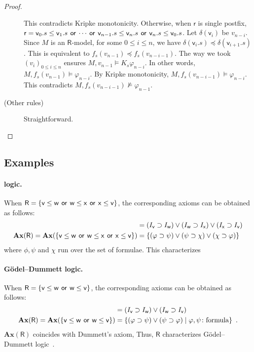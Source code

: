 \begin{proof}
\begin{description}
	   This contradicts Kripke monotonicity.
	   Otherwise, when $\mathsf r$ is single postfix,
	   $\mathsf r = \mathsf v_0.s\le\mathsf
	   v_1.s\,\mathbin{\mathsf{or}}\,\cdots\,\mathbin{\mathsf{or}}\,\mathsf v_{n-1}.s\le\mathsf
	   v_n.s\,\mathbin{\mathsf{or}}\,\mathsf v_n.s\le\mathsf v_0.s$.
	   Let $\delta(\mathsf v_i)$ be $v_{n-i}$.
	   Since $M$ is an $\mathsf R$-model,
	   for some $0\le i\le n$,
	   we have $\delta(\mathsf v_i.s)\preceq \delta(\mathsf
	   v_{i+1}.s)$.
	   This is equivalent to $f_s(v_{n-1})\preceq f_s(v_{n-i-1})$.
	   The way we took $(v_i)_{0\le i\le n}$ ensures
	   $M,v_{n-1}\models K_s\varphi_{n-i}$.
	   In other words, $M,f_s(v_{n-1})\models \varphi_{n-i}$.
	   By Kripke monotonicity, $M,f_s(v_{n-i-1})\models
	   \varphi_{n-i}$.
	   This contradicts $M,f_s(v_{n-i-1})\not\models\varphi_{n-1}$.
      \item[(Other rules)]
	   Straightforward.
     \end{description}
    \end{proof}

   \subsection{Examples}

    \paragraph{ logic.}
    When
    $\mathsf R = \{\mathsf v\le\mathsf w\,\mathbin{\mathsf{or}}\,\mathsf w\le\mathsf x\,\mathbin{\mathsf{or}}\,\mathsf x\le\mathsf
    v\}$,
    the corresponding axioms can be obtained as follows:
    \begin{align*}
     [ \mathsf v\le \mathsf w\wor \mathsf w\le\mathsf x\wor \mathsf x\le\mathsf v ] &=
     (I_{\mathsf v}\supset I_{\mathsf w})\vee (I_{\mathsf w}\supset
     I_{\mathsf x})\vee (I_{\mathsf x}\supset I_{\mathsf v})
     \\
     \mathbf{Ax}(\mathsf R) = \mathbf{Ax}(\{\mathsf v\le\mathsf w\wor \mathsf
     w\le \mathsf x \wor \mathsf x\le\mathsf v\}) &= \{(\varphi\supset\psi)\vee(\psi\supset\chi)\vee(\chi\supset\varphi)\}
    \end{align*}
    where $\phi,\psi$ and $\chi$ run over the set of formulae.
    This characterizes 

    \paragraph{G\"{o}del--Dummett logic.}
    When $\mathsf R=\{\mathsf v\le\mathsf w\,\mathbin{\mathsf{or}}\,\mathsf w\le\mathsf v\}$,
    the corresponding axioms can be obtained as follows:
    \begin{align*}
     [\mathsf v\le \mathsf w\wor \mathsf w\le\mathsf v] &=
     (I_{\mathsf v}\supset I_{\mathsf w})\vee (I_{\mathsf w}\supset
     I_{\mathsf v})\\
     \mathbf{Ax}(\mathsf R) = \mathbf{Ax}(\{\mathsf v\le\mathsf w\wor \mathsf
     w\le \mathsf v\}) &= \{(\varphi\supset\psi)\vee(\psi\supset\varphi)\mid
     \varphi,\psi\colon\mbox{formula}\}\enspace.
    \end{align*}
    $\mathbf{Ax}(\mathsf R)$ coincides with Dummett's axiom,  Thus,
    $\mathsf R$ characterizes
    G\"{o}del--Dummett logic~\cite{dummett59}.

